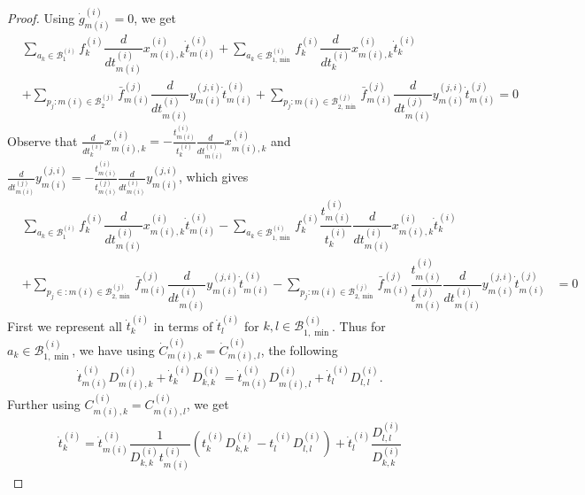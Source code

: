 \documentclass{article}
\begin{document}
\begin{proof}
        
          Using $\dot{g}^{(i)}_{m(i)}=0$, we get
    \begin{align*}
        &\sum_{a_k\in\mathcal{B}_1^{(i)}}f^{(i)}_k\dfrac{d}{dt^{(i)}_{m(i)}}x^{(i)}_{m(i),k}\dot{t}^{(i)}_{m(i)}+ \sum_{a_k\in\mathcal{B}_{1,\min}^{(i)}}f^{(i)}_k\dfrac{d}{dt^{(i)}_{k}}x^{(i)}_{m(i),k}\dot{t}^{(i)}_{k}  \\
        &+ \sum_{p_j:m(i)\in\mathcal{B}_2^{(j)}}\bar{f}^{(j)}_{m(i)}\dfrac{d}{dt^{(i)}_{m(i)}}y^{(j,i)}_{m(i)}\dot{t}^{(i)}_{m(i)} +\sum_{p_j:m(i)\in\mathcal{B}_{2,\min}^{(j)}}\bar{f}^{(j)}_{m(i)}\dfrac{d}{dt^{(j)}_{m(i)}}y^{(j,i)}_{m(i)}\dot{t}^{(j)}_{m(i)} =0
    \end{align*}
    Observe that $\frac{d}{dt^{(i)}_{k}}x^{(i)}_{m(i),k}=-\frac{t^{(i)}_{m(i)}}{t^{(i)}_k}\frac{d}{dt^{(i)}_{m(i)}}x^{(i)}_{m(i),k}$ and $\frac{d}{dt^{(j)}_{m(i)}}y^{(j,i)}_{m(i)} = -\frac{t^{(i)}_{m(i)}}{t^{(j)}_{m(i)}}\frac{d}{dt^{(i)}_{m(i)}}y^{(j,i)}_{m(i)}$, which gives
     \begin{align*}
        &\sum_{a_k\in\mathcal{B}_1^{(i)}}f^{(i)}_k\dfrac{d}{dt^{(i)}_{m(i)}}x^{(i)}_{m(i),k}\dot{t}^{(i)}_{m(i)}- \sum_{a_k\in\mathcal{B}_{1,\min}^{(i)}}f^{(i)}_k\dfrac{t^{(i)}_{m(i)}}{t^{(i)}_k}\dfrac{d}{dt^{(i)}_{m(i)}}x^{(i)}_{m(i),k}\dot{t}^{(i)}_{k} \\
        &+ \sum_{p_j\in:m(i)\in\mathcal{B}_{2,\min}^{(j)}}\bar{f}^{(j)}_{m(i)}\dfrac{d}{dt^{(i)}_{m(i)}}y^{(j,i)}_{m(i)}\dot{t}^{(i)}_{m(i)} -\sum_{p_j:m(i)\in\mathcal{B}_{2,\min}^{(j)}}\bar{f}^{(j)}_{m(i)}\dfrac{t^{(i)}_{m(i)}}{t^{(j)}_{m(i)}}\dfrac{d}{dt^{(i)}_{m(i)}}y^{(j,i)}_{m(i)}\dot{t}^{(j)}_{m(i)} &=0
    \end{align*}
   First we represent all $\dot{t}^{(i)}_k$ in terms of $\dot{t}^{(i)}_l$ for $k,l\in\mathcal{B}_{1,\min}^{(i)}$. Thus for $a_k\in\mathcal{B}^{(i)}_{1,\min}$, we have using $\dot{C}^{(i)}_{m(i),k}=\dot{C}^{(i)}_{m(i),l}$, the following
    \begin{align*}
    \dot{t}^{(i)}_{m(i)}D^{(i)}_{m(i),k} + \dot{t}^{(i)}_kD^{(i)}_{k,k}= \dot{t}^{(i)}_{m(i)}D^{(i)}_{m(i),l} + \dot{t}^{(i)}_lD^{(i)}_{l,l}.
    \end{align*}
    Further using ${C}^{(i)}_{m(i),k}={C}^{(i)}_{m(i),l}$, we get
    \begin{align*}
        \dot{t}^{(i)}_k = \dot{t}^{(i)}_{m(i)}\dfrac{1}{D^{(i)}_{k,k}t^{(i)}_{m(i)}}(t^{(i)}_kD^{(i)}_{k,k}-t^{(i)}_lD^{(i)}_{l,l}) + \dot{t}^{(i)}_l\dfrac{D^{(i)}_{l,l}}{D^{(i)}_{k,k}}
    \end{align*}


\end{proof}
\end{document}
